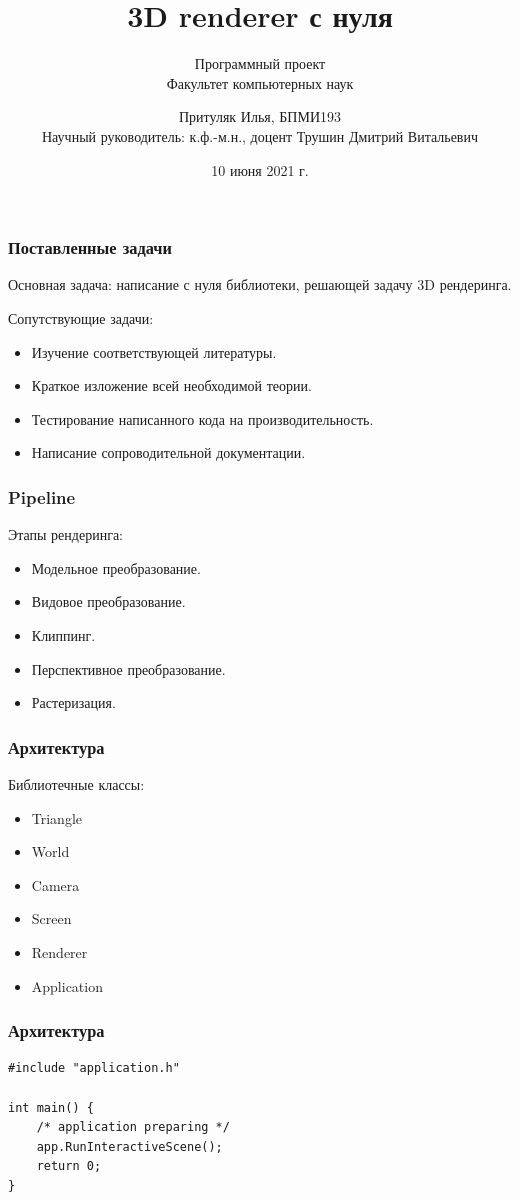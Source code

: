 \documentclass{beamer}
\title[Заголовок]{3D renderer с нуля}
\subtitle{Программный проект \\ Факультет компьютерных наук}
\author[Притуляк Илья]{Притуляк Илья, БПМИ193 \texorpdfstring{\\ \scriptsize Научный руководитель: к.ф.-м.н., доцент Трушин Дмитрий Витальевич}{Lg}}
\institute[Высшая школа экономики]{Национальный исследовательский университет \\ «Высшая школа экономики» (Москва)}
\date{10 июня 2021 г.}
\begin{document}

\frame[plain]{\titlepage}	%

\begin{frame}
\frametitle{Поставленные задачи}

Основная задача: написание с нуля библиотеки, решающей задачу 3D рендеринга. \pause

Сопутствующие задачи:
\begin{itemize}
	\item Изучение соответствующей литературы. \pause
	\item Краткое изложение всей необходимой теории. \pause
	\item Тестирование написанного кода на производительность. \pause
	\item Написание сопроводительной документации.
\end{itemize}

\end{frame}

\begin{frame}
\frametitle{Pipeline}

Этапы рендеринга:
\begin{itemize}
	\item Модельное преобразование. \pause
	\item Видовое преобразование. \pause
	\item Клиппинг. \pause
	\item Перспективное преобразование. \pause
	\item Растеризация.
\end{itemize}
\end{frame}

\begin{frame}
\frametitle{Архитектура}

Библиотечные классы:
\begin{itemize}
	\item Triangle \pause
 	\item World \pause
 	\item Camera \pause
 	\item Screen \pause
 	\item Renderer \pause
 	\item Application
\end{itemize}
\end{frame}

\begin{frame}[fragile]
\frametitle{Архитектура}

\begin{lstlisting}
#include "application.h"

int main() {
    /* application preparing */
    app.RunInteractiveScene();
    return 0;
}
\end{lstlisting}
\end{frame}
\end{document}

